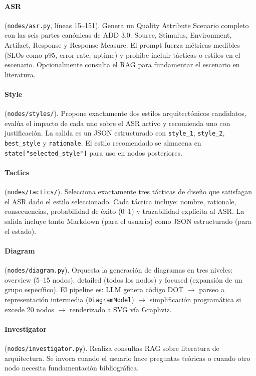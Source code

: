 \documentclass[12pt, letterpaper, oneside]{article}
\begin{document}
\paragraph{ASR} (\texttt{nodes/asr.py}, líneas 15--151).
Genera un Quality Attribute Scenario completo con las seis partes canónicas
de ADD 3.0: Source, Stimulus, Environment, Artifact, Response y Response Measure.
El prompt fuerza métricas medibles (SLOs como p95, error rate, uptime) y
prohibe incluir tácticas o estilos en el escenario. Opcionalmente consulta el
RAG para fundamentar el escenario en literatura.

\paragraph{Style} (\texttt{nodes/styles/}).
Propone exactamente dos estilos arquitectónicos candidatos, evalúa el impacto de
cada uno sobre el ASR activo y recomienda uno con justificación. La salida es un
JSON estructurado con \texttt{style\_1}, \texttt{style\_2}, \texttt{best\_style}
y \texttt{rationale}. El estilo recomendado se almacena en
\texttt{state["selected\_style"]} para uso en nodos posteriores.

\paragraph{Tactics} (\texttt{nodes/tactics/}).
Selecciona exactamente tres tácticas de diseño que satisfagan el ASR dado el
estilo seleccionado. Cada táctica incluye: nombre, rationale, consecuencias,
probabilidad de éxito (0--1) y trazabilidad explícita al ASR. La salida
incluye tanto Markdown (para el usuario) como JSON estructurado (para el estado).

\paragraph{Diagram} (\texttt{nodes/diagram.py}).
Orquesta la generación de diagramas en tres niveles: overview (5--15 nodos),
detailed (todos los nodos) y focused (expansión de un grupo específico). El
pipeline es: LLM genera código DOT $\rightarrow$ parseo a representación
intermedia (\texttt{DiagramModel}) $\rightarrow$ simplificación programática si
excede 20 nodos $\rightarrow$ renderizado a SVG vía Graphviz.

\paragraph{Investigator} (\texttt{nodes/investigator.py}).
Realiza consultas RAG sobre literatura de arquitectura. Se invoca cuando el
usuario hace preguntas teóricas o cuando otro nodo necesita fundamentación
bibliográfica.
\end{document}

